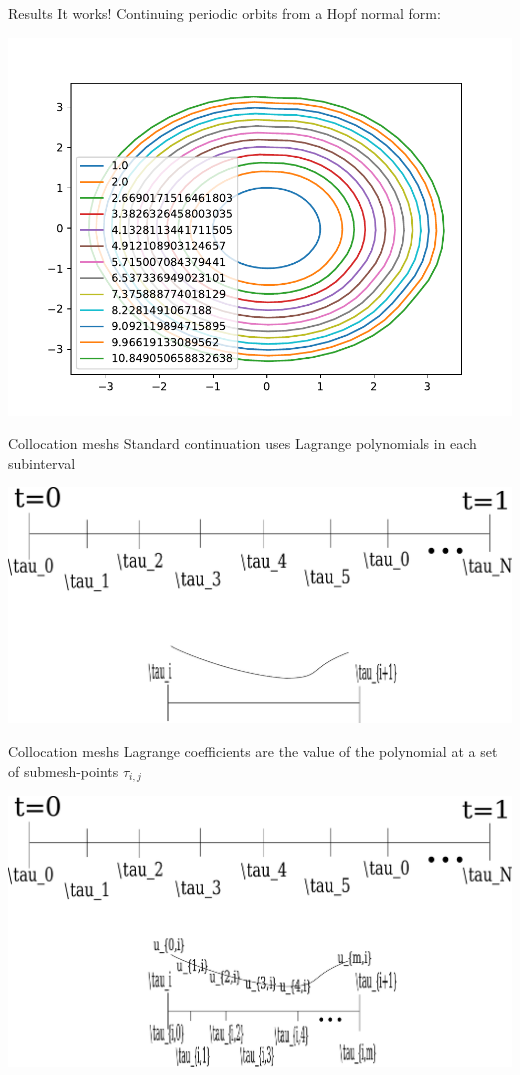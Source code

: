 \documentclass[presentation]{beamer}
\begin{document}
\begin{frame}[label={sec:orgf851484},plain]{Results}
\vfill 
It works! Continuing periodic orbits from a Hopf normal form:

\begin{center}
\includegraphics[width=.9\linewidth]{./PO_continuation.pdf}
\end{center}
\end{frame}

\begin{frame}[label={sec:orgd80bfd0}]{Collocation meshs}
Standard continuation uses Lagrange polynomials in each subinterval
\begin{center}
\includegraphics[width=.9\linewidth]{./5_basis.pdf}
\end{center}
\end{frame}

\begin{frame}[label={sec:org047a9f9},plain]{Collocation meshs}
Lagrange coefficients are the value of the polynomial at a set of submesh-points \(\tau_{i,j}\)
\begin{center}
\includegraphics[width=.9\linewidth]{./6_submesh.pdf}
\end{center}
\end{frame}
\end{document}
